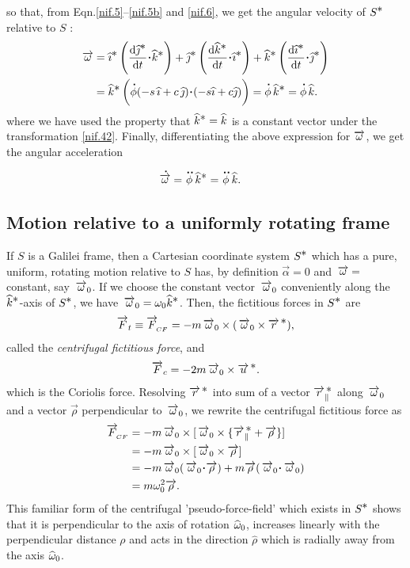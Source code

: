 so that, from Eqn.\eqref{nif.5}--\eqref{nif.5b} and 
\eqref{nif.6}, we get the angular velocity of $S ^{{\textstyle \ast}}$ 
relative to $S$ :
\begin{align}
\vec{\gkw}&= \eye^{\bst}\left(\dv{ \jay^{\bst}}{t}
\dotp\kay^{\bst}\right)
+\jay^{\bst}\left( \dv{\kay^{\bst}}{t}
\dotp\eye^{\bst}\right)
+\kay^{\bst}\left( \dv{\eye^{\bst}}{t}
\dotp\jay^{\bst}\right)\notag \\
&=\kay^{\bst}\left(\dotup{\phi}(-s \,\eye+c \, \jay) 
\dotp(-s \eye +c \jay)\right) 
=\dotup{\phi}\,\kay^{\bst}=\dotup{\phi}\, \kay. 
\end{align}
where we have used the property that 
${\widehat{k}}^{{\textstyle \ast}}={\widehat{k}}$ is a constant vector under the 
transformation \eqref{nif.42}. Finally, differentiating 
the above expression for $\overrightarrow{{\omega}}$, we get the 
angular acceleration
\begin{align}
{\ensuremath{\overset{\hspace*{1.5pt}\centerdot}{\overrightarrow{{\omega}}}} }&= \overset{\hspace*{1.5pt}\centerdot\hspace{ 1pt}\centerdot }{\phi}\,{\widehat{k}}^{{\textstyle \ast}}
=\overset{\hspace*{1.5pt}\centerdot\hspace{ 1pt}\centerdot }{\phi}\, {\widehat{k}}.
\end{align}
\subsection{Motion relative to  a uniformly
rotating  frame}
If $S$ is a Galilei frame, then a Cartesian coordinate 
system $S^{\textstyle \ast}$ which has a pure, uniform, rotating 
motion relative to $S$ has, by definition 
$\vec{\alpha}=0 $ and $\,\overrightarrow{{\omega}}=$ constant, say 
$\,\overrightarrow{{\omega}}_0 $. If we choose the constant vector 
$\,\overrightarrow{{\omega}}_0$ conveniently along the 
${\widehat{k}}^{{\textstyle \ast}}$-axis of $S^{\textstyle \ast}$, we have $\,\overrightarrow{{\omega}}_0 
={\omega}_0 {\widehat{k}}^{{\textstyle \ast}}$. Then, the fictitious forces in 
$S^{\textstyle \ast}$ are \begin{align}\label{nif.35} \overrightarrow{F}_{t} \equiv 
\overrightarrow{F}_{{_{\hspace*{-1.5pt}{CF}}}}= -m \,\overrightarrow{{\omega}}_0\times ( 
\,\overrightarrow{{\omega}}_0 
\times \overrightarrow{r}^{\,{\textstyle \ast} }),
\end{align}
called the \textsl{centrifugal fictitious force}, and
\begin{align}\label{nif.36}
\overrightarrow{F}_{c}=-2m\,\overrightarrow{{\omega}}_0\times{\overrightarrow{u}^{\,{\ensuremath{\textstyle \ast}}}}.
\end{align}
which is the Coriolis force. Resolving $\overrightarrow{r}^{\,{\textstyle \ast} }$ 
into sum of a vector $\overrightarrow{r}_{\parallel}^{\,{\textstyle \ast} }$ along 
$\,\overrightarrow{{\omega}}_0$ and a vector $\vec{\rho}$ perpendicular to 
$\,\overrightarrow{{\omega}}_0 $, we rewrite the centrifugal fictitious 
force as
\begin{align}\label{nif.37}
\vec{F}_{\sfx{CF}} &=-m \,\vec{\gkw}_0
\times [\,\vec{\gkw}_0\times
\{\vec{r}_{\parallel}^{\,\bst } +\vec{\rho}\} ]
 \notag\\&= -m \,\vec{\gkw}_0 \times [ \,\vec{\gkw}_0
\times \vec{\rho} ]\notag\\&
= -m\,\vec{\gkw}_0 (\,\vec{\gkw}_0 \dotp
\vec{\rho}) + m\vec{\rho}
(\,\vec{\gkw}_0 \dotp \,\vec{\gkw}_0) \notag\\&
= m\gkw_0^2 \vec{\rho}.
\end{align}
This familiar form of the centrifugal 
'pseudo-force-field' which exists in $S^{\textstyle \ast}$ shows 
that it is perpendicular to the axis of rotation 
${\widehat{{\omega}}}_0$, increases linearly with the 
perpendicular distance $\rho$ and acts in the direction 
$ \hat{\rho}$ which is radially away from the axis 
${\widehat{{\omega}}}_0$.


